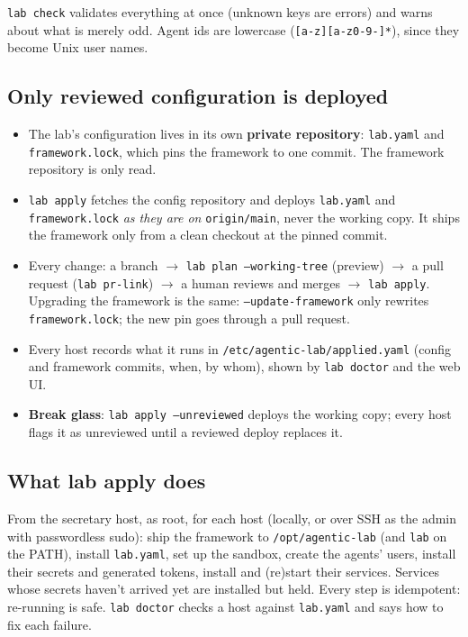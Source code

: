 \documentclass[11pt]{article}
\newcommand{\code}[1]{\texttt{#1}}
\begin{document}
\medskip
\code{lab check} validates everything at once (unknown keys are errors) and warns about what
is merely odd. Agent ids are lowercase (\code{[a-z][a-z0-9-]*}), since they become Unix
user names.

\subsection{Only reviewed configuration is deployed}
\begin{itemize}
  \item The lab's configuration lives in its own \textbf{private repository}:
    \code{lab.yaml} and \code{framework.lock}, which pins the framework to one commit. The
    framework repository is only read.
  \item \code{lab apply} fetches the config repository and deploys \code{lab.yaml} and
    \code{framework.lock} \emph{as they are on} \code{origin/main}, never the working copy.
    It ships the framework only from a clean checkout at the pinned commit.
  \item Every change: a branch $\to$ \code{lab plan --working-tree} (preview) $\to$ a pull
    request (\code{lab pr-link}) $\to$ a human reviews and merges $\to$ \code{lab apply}.
    Upgrading the framework is the same: \code{--update-framework} only rewrites
    \code{framework.lock}; the new pin goes through a pull request.
  \item Every host records what it runs in \code{/etc/agentic-lab/applied.yaml} (config and
    framework commits, when, by whom), shown by \code{lab doctor} and the web UI.
  \item \textbf{Break glass}: \code{lab apply --unreviewed} deploys the working copy; every
    host flags it as unreviewed until a reviewed deploy replaces it.
\end{itemize}

\subsection{What lab apply does}
From the secretary host, as root, for each host (locally, or over SSH as the admin with
passwordless sudo): ship the framework to \code{/opt/agentic-lab} (and \code{lab} on the
PATH), install \code{lab.yaml}, set up the sandbox, create the agents' users, install their
secrets and generated tokens, install and (re)start their services. Services whose secrets
haven't arrived yet are installed but held. Every step is idempotent: re-running is safe.
\code{lab doctor} checks a host against \code{lab.yaml} and says how to fix each failure.
\end{document}
